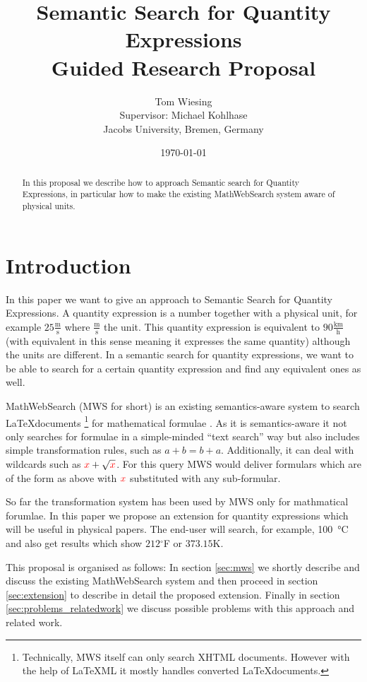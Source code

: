 \documentclass[11pt]{article}
\title{Semantic Search for Quantity Expressions\\ \vspace{2 mm} Guided Research Proposal}
\author{Tom Wiesing\\Supervisor: Michael Kohlhase\\Jacobs University, Bremen, Germany}
\date{\today}
\begin{document}
\maketitle

\begin{abstract}
  In this proposal we describe how to approach Semantic search for Quantity Expressions, in particular how to make the existing MathWebSearch system aware of physical units.
\end{abstract}

\section{Introduction}

In this paper we want to give an approach to Semantic Search for Quantity Expressions. A quantity expression is a number together with a physical unit, for example $25 \frac{\text{m}}{\text{s}}$ where $\frac{\text{m}}{\text{s}}$ the unit. This quantity expression is equivalent to $90 \frac{\text{km}}{\text{h}}$ (with equivalent in this sense meaning it expresses the same quantity) although the units are different. In a semantic search for quantity expressions, we want to be able to search for a certain quantity expression and find any equivalent ones as well.

MathWebSearch (MWS for short) is an existing semantics-aware system to search \LaTeX documents \footnote{Technically, MWS itself can only search XHTML documents. However with the help of \LaTeX ML it mostly handles converted \LaTeX  documents. } for mathematical formulae \cite{HamKohPro:man14}. As it is semantics-aware it not only searches for formulae in a simple-minded ``text search'' way but also includes simple transformation rules, such as $a + b = b + a$. Additionally, it can deal with wildcards such as $ { \color{red} x} + \sqrt{\color{red} x}$. For this query MWS would deliver formulars which are of the form as above with $ { \color{red} x} $ substituted with any sub-formular.

So far the transformation system has been used by MWS only for mathmatical forumlae. In this paper we propose an extension for quantity expressions which will be useful in physical papers.
The end-user will search, for example, \SI{100}{\degreeCelsius} and also get results which show $212$$^\circ$F or $373.15$K.

This proposal is organised as follows: In section \ref{sec:mws} we shortly describe and discuss the existing MathWebSearch system and then proceed in section \ref{sec:extension} to describe in detail the proposed extension. Finally in section \ref{sec:problems_relatedwork} we discuss possible problems with this approach and related work.
\end{document}
